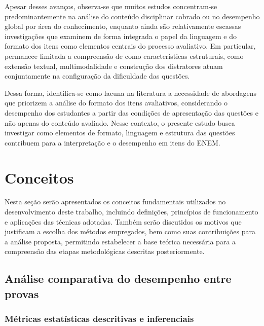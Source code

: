 \documentclass[a4paper,10pt, twocolumn]{article}
\begin{document}
Apesar desses avanços, observa-se que muitos estudos concentram-se predominantemente na análise do conteúdo disciplinar cobrado ou no desempenho global por área do conhecimento, enquanto ainda são relativamente escassas investigações que examinem de forma integrada o papel da linguagem e do formato dos itens como elementos centrais do processo avaliativo. Em particular, permanece limitada a compreensão de como características estruturais, como extensão textual, multimodalidade e construção dos distratores atuam conjuntamente na configuração da dificuldade das questões.

Dessa forma, identifica-se como lacuna na literatura a necessidade de abordagens que priorizem a análise do formato dos itens avaliativos, considerando o desempenho dos estudantes a partir das condições de apresentação das questões e não apenas do conteúdo avaliado. Nesse contexto, o presente estudo busca investigar como elementos de formato, linguagem e estrutura das questões contribuem para a interpretação e o desempenho em itens do ENEM.

\section{Conceitos}
Nesta seção serão apresentados os conceitos fundamentais utilizados no desenvolvimento deste trabalho, incluindo definições, princípios de funcionamento e aplicações das técnicas adotadas. Também serão discutidos os motivos que justificam a escolha dos métodos empregados, bem como suas contribuições para a análise proposta, permitindo estabelecer a base teórica necessária para a compreensão das etapas metodológicas descritas posteriormente.


\subsection{Análise comparativa do desempenho entre provas}

\subsubsection{Métricas estatísticas descritivas e inferenciais}
\end{document}
